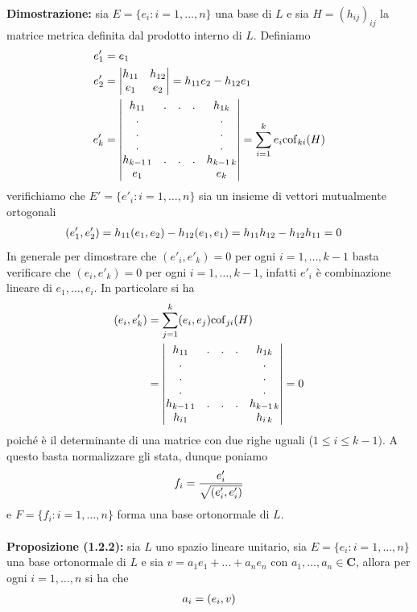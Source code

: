 \documentclass{article}
\begin{document}
\textbf{Dimostrazione:} sia $E = \{e_i : i = 1, \dots, n\}$ una base di $L$ e sia $H = (h_{ij})_{ij}$ la matrice metrica definita dal prodotto interno di $L$. Definiamo
\begin{align}
    e'_1 &= e_1 \notag \\
    e'_2 &= \begin{vmatrix}
        h_{11} & h_{12} \\
        e_1 & e_2
    \end{vmatrix} = h_{11}e_2 - h_{12}e_1 \notag \\
    e'_k &= \begin{vmatrix}
        h_{11} & . & . & . & h_{1k} \\
        . & & & & . \\
        . & & & & . \\
        . & & & & . \\
        h_{k-1 \, 1} & . & . & . & h_{k-1 \, k} \\
        e_1 & & & & e_k
    \end{vmatrix} = \sum_{i = 1}^k e_i\mathrm{cof}_{ki}(H) \notag
\end{align}
verifichiamo che $E' = \{e'_i : i = 1, \dots, n\}$ sia un insieme di vettori mutualmente ortogonali
\begin{align}
    (e'_1, e'_2) &= h_{11}(e_1, e_2) - h_{12}(e_1, e_1) = h_{11}h_{12} - h_{12}h_{11} = 0 \notag
\end{align}
In generale per dimostrare che $(e'_i, e'_k) = 0$ per ogni $i = 1, \dots, k-1$ basta verificare che $(e_i, e'_k) = 0$ per ogni $i = 1, \dots, k-1$, infatti $e'_i$ è combinazione lineare di $e_1, \dots, e_i$. In particolare si ha
\begin{align}
    (e_i, e'_k) &= \sum_{j = 1}^k(e_i, e_j)\mathrm{cof}_{ji}(H) \notag \\
    &= \begin{vmatrix}
         h_{11} & . & . & . & h_{1k} \\
        . & & & & . \\
        . & & & & . \\
        . & & & & . \\
        h_{k-1 \, 1} & . & . & . & h_{k-1 \, k} \\
        h_{i1} & & & & h_{i \, k}
    \end{vmatrix} = 0 \notag
\end{align}
poiché è il determinante di una matrice con due righe uguali ($1 \leq i \leq k-1)$. A questo basta normalizzare gli stata, dunque poniamo
\begin{gather}
    f_i = \frac{e'_i}{\sqrt{(e'_i, e'_i)}} \notag
\end{gather}
e $F = \{f_i : i = 1, \dots, n\}$ forma una base ortonormale di $L$. \\ \\
\textbf{Proposizione (1.2.2):} sia $L$ uno spazio lineare unitario, sia $E = \{e_i : i = 1, \dots, n\}$ una base ortonormale di $L$ e sia $v = a_1e_1 + \dots + a_ne_n$ con $a_1, \dots, a_n \in \mathbf{C}$, allora per ogni $i = 1, \dots, n$ si ha che
\begin{gather}
    a_i = (e_i, v) \notag
\end{gather}
\end{document}
